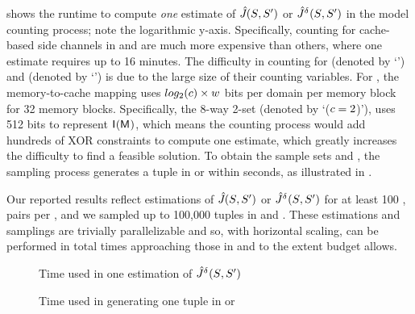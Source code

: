  shows the runtime to compute \textit{one}
estimate of $\hat{J}_{}(S_{},S_{}')$ or
$\hat{J}^{\delta_{\mbox{}}}_{}(S_{},S_{}')$ in the model
counting process; note the logarithmic y-axis.  Specifically, counting
for cache-based side channels in \scatterCache and  are
much more expensive than others, where one estimate requires up to 16
minutes.  The difficulty in counting for \scatterCache (denoted by
`\scatterCacheAbbr') and  (denoted by
`') is due to the large size of their counting
variables.  For \scatterCache, the memory-to-cache mapping uses
$log_2(c) \times w$ bits per domain per
memory block for 32 memory blocks. Specifically, the 8-way 2-set
\scatterCache (denoted by `\scatterCacheAbbr ($c=2$)'),
uses 512 bits to represent $\mathsf{I}_{}(\textsf{M}_{})$, which means the
counting process would add hundreds of XOR constraints to compute one
estimate, which greatly increases the difficulty to find a feasible
solution.  To obtain the sample sets \interferenceSetSamples and
\noninterferenceSetSamples, the sampling process generates a tuple in
\interferenceSetSamples or \noninterferenceSetSamples within seconds,
as illustrated in .

Our reported results reflect estimations of
$\hat{J}_{}(S_{},S_{}')$ or
$\hat{J}^{\delta_{\mbox{}}}_{}(S_{},S_{}')$ for at least
100 \secretsSet{}, \secretsSetAlt{} pairs per \secretsSetSize, and we
sampled up to 100,000 tuples in \interferenceSetSamples and
\noninterferenceSetSamples.  These estimations and samplings are
trivially parallelizable and so, with horizontal scaling, can be
performed in total times approaching those in 
and  to the extent budget allows.

\begin{figure}
\small{\resizebox{0.95\linewidth}{!}{\large}}
\caption{Time used in one estimation of
  $\hat{J}^{\delta_{\mbox{}}}_{}(S_{},S_{}')$
  \label{fig:cost:count}}
\end{figure}

\begin{figure}
\small{\resizebox{0.95\linewidth}{!}{\large}}
\caption{Time used in generating one tuple in
\noninterferenceSetSamples or
\interferenceSetSamples \label{fig:cost:sample}}
\end{figure}

